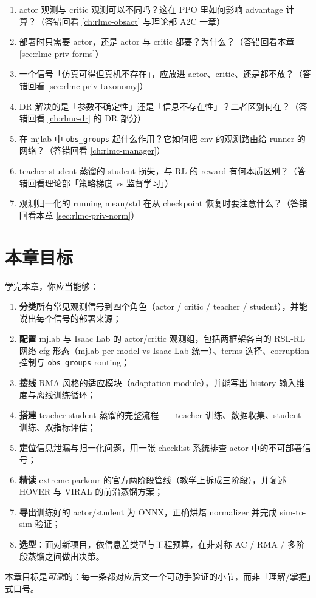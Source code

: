 \begin{practice}
\begin{enumerate}
  \item actor 观测与 critic 观测可以不同吗？这在 PPO 里如何影响 advantage 计算？（答错回看 \cref{ch:rlmc-obsact} 与理论部 A2C 一章）
  \item 部署时只需要 actor，还是 actor 与 critic 都要？为什么？（答错回看本章 \cref{sec:rlmc-priv-forms}）
  \item 一个信号「仿真可得但真机不存在」，应放进 actor、critic、还是都不放？（答错回看 \cref{sec:rlmc-priv-taxonomy}）
  \item DR 解决的是「参数不确定性」还是「信息不存在性」？二者区别何在？（答错回看 \cref{ch:rlmc-dr} 的 DR 部分）
  \item 在 mjlab 中 \texttt{obs\_groups} 起什么作用？它如何把 env 的观测路由给 runner 的网络？（答错回看 \cref{ch:rlmc-manager}）
  \item teacher-student 蒸馏的 student 损失，与 RL 的 reward 有何本质区别？（答错回看理论部「策略梯度 vs 监督学习」）
  \item 观测归一化的 running mean/std 在从 checkpoint 恢复时要注意什么？（答错回看本章 \cref{sec:rlmc-priv-norm}）
\end{enumerate}
\end{practice}

\section*{本章目标}
\label{sec:rlmc-priv-goals}

学完本章，你应当能够：
\begin{enumerate}
  \item \textbf{分类}所有常见观测信号到四个角色（actor / critic / teacher / student），并能说出每个信号的部署来源；
  \item \textbf{配置} mjlab 与 Isaac Lab 的 actor/critic 观测组，包括两框架各自的 RSL-RL 网络 cfg 形态（mjlab per-model vs Isaac Lab 统一）、terms 选择、corruption 控制与 \verb|obs_groups| routing；
  \item \textbf{接线} RMA 风格的适应模块（adaptation module），并能写出 history 输入维度与离线训练循环；
  \item \textbf{搭建} teacher-student 蒸馏的完整流程——teacher 训练、数据收集、student 训练、双指标评估；
  \item \textbf{定位}信息泄漏与归一化问题，用一张 checklist 系统排查 actor 中的不可部署信号；
  \item \textbf{精读} extreme-parkour 的官方两阶段管线（教学上拆成三阶段），并复述 HOVER 与 VIRAL 的前沿蒸馏方案；
  \item \textbf{导出}训练好的 actor/student 为 ONNX，正确烘焙 normalizer 并完成 sim-to-sim 验证；
  \item \textbf{选型}：面对新项目，依信息差类型与工程预算，在非对称 AC / RMA / 多阶段蒸馏之间做出决策。
\end{enumerate}
本章目标是\emph{可测}的：每一条都对应后文一个可动手验证的小节，而非「理解/掌握」式口号。

